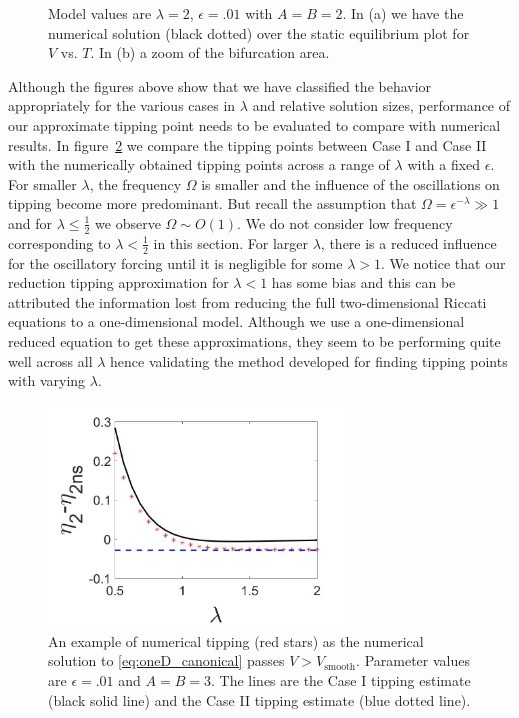 \begin{figure}[H]
\begin{subfigure}{.5\textwidth}
 \caption{}
\end{subfigure}
\caption{Model values are $\lambda=2$, $\epsilon=.01$ with $A=B=2$. In (a) we have the numerical solution (black dotted) over the static equilibrium plot for $V$ vs. $T$. In (b) a zoom of the bifurcation area.}
\label{fig:twoD_slowosc_Tnumerics_large}
\end{figure}

Although the figures above show that we have classified the behavior appropriately for the various cases in $\lambda$ and relative solution sizes, performance of our approximate tipping point needs to be evaluated to compare with numerical results. In figure~\ref{fig:twoD_slowosc_lambdacomp} we compare the tipping points between Case I and Case II with the numerically obtained tipping points across a range of $\lambda$ with a fixed $\epsilon$. For smaller $\lambda$, the frequency $\Omega$ is smaller and the influence of the oscillations on tipping become more predominant. But recall the assumption that $\Omega=\epsilon^{-\lambda}\gg 1$ and for $\lambda\le\frac{1}{2}$ we observe $\Omega\sim O(1)$. We do not consider low frequency corresponding to $\lambda<\frac{1}{2}$ in this section. For larger $\lambda$, there is a reduced influence for the oscillatory forcing until it is negligible for some $\lambda>1$. We notice that our reduction tipping approximation for $\lambda<1$ has some bias and this can be attributed the information lost from reducing the full two-dimensional Riccati equations to a one-dimensional model. Although we use a one-dimensional reduced equation to get these approximations, they seem to be performing quite well across all $\lambda$ hence validating the method developed for finding tipping points with varying $\lambda$.

\begin{figure}[H]
\centering
\includegraphics[width=0.7\textwidth]{twoD/slowosc_lambdacomp.jpg}
\caption{An example of numerical tipping (red stars) as the numerical solution to \eqref{eq:oneD_canonical} passes $V>V_{\text{smooth}}$. Parameter values are $\epsilon=.01$ and $A=B=3$. The lines are the Case I tipping estimate (black solid line) and the Case II tipping estimate (blue dotted line).}
\label{fig:twoD_slowosc_lambdacomp}
\end{figure} 

